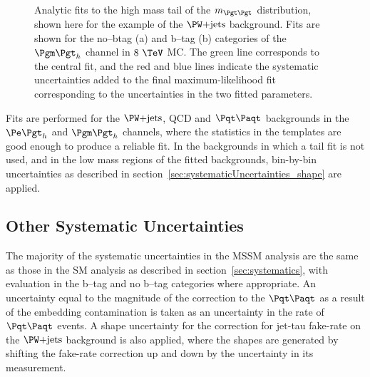 \begin{figure}[tbh]
\caption{Analytic fits to the high mass tail of the $m_{\Pgt\Pgt}$ distribution,
shown here for the example of the $\WJets$ background. Fits are shown for the
no--btag (a) and b--tag (b) categories of the $\mutau$ channel in $8~\TeV$
\ac{MC}. The green line corresponds to the central fit, and the red and blue
lines indicate the systematic uncertainties added to the final
maximum-likelihood fit corresponding to the uncertainties in the two fitted
parameters.}
\label{fig:tailfits}
\end{figure}

Fits are performed for the $\WJets$, QCD and $\ttbar$ backgrounds in the $\etau$
and $\mutau$ channels, where the statistics in the templates are good enough to
produce a reliable fit. In the backgrounds in which a tail fit is not used, and
in the low mass regions of the fitted backgrounds, bin-by-bin uncertainties as
described in section~\ref{sec:systematicUncertainties_shape} are applied.

\subsection{Other Systematic Uncertainties}
The majority of the systematic uncertainties in the \ac{MSSM} analysis are the
same as those in the \ac{SM} analysis as described in
section~\ref{sec:systematics}, with evaluation in the b--tag and no
b--tag categories where appropriate. An uncertainty equal to the magnitude of
the correction to the $\ttbar$ as a result of the embedding contamination
is taken as an uncertainty in the rate of $\ttbar$ events. A shape 
uncertainty for the correction for jet-tau fake-rate on the $\WJets$ background
is also applied, where the shapes are generated by shifting the fake-rate
correction up and down by the uncertainty in its measurement. 

